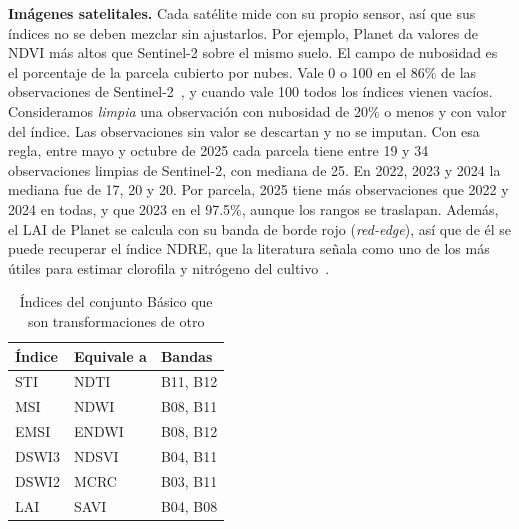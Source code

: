 \textbf{Imágenes satelitales.} Cada satélite mide con su propio sensor, así que sus índices no se deben mezclar sin
ajustarlos. Por ejemplo, Planet da valores de NDVI más altos que Sentinel-2 sobre el mismo suelo. El campo de
nubosidad es el porcentaje de la parcela cubierto por nubes. Vale 0 o 100 en el 86\% de las observaciones de Sentinel-2~\cite{drusch2012}, y cuando vale 100 todos los índices vienen vacíos. Consideramos \emph{limpia} una observación con nubosidad de 20\% o menos y con valor del índice. Las observaciones sin valor se descartan y no se imputan. Con esa regla, entre mayo y octubre de 2025 cada parcela tiene entre 19 y 34 observaciones limpias de Sentinel-2, con mediana de 25. En 2022, 2023 y 2024 la mediana fue de 17, 20 y 20. Por parcela, 2025 tiene más observaciones que 2022 y 2024 en todas, y que 2023 en el 97.5\%, aunque los rangos se traslapan. Además, el LAI de Planet se calcula con su banda de borde rojo
(\emph{red-edge}), así que de él se puede recuperar el índice NDRE, que la literatura señala como uno de los más
útiles para estimar clorofila y nitrógeno del cultivo~\cite{clevers2013}.


\begin{table}[!t]
\caption{Índices del conjunto Básico que son transformaciones de otro}\label{tab:duplicados}
\centering\footnotesize
\begin{tabular}{@{}lll@{}}
\toprule
Índice & Equivale a & Bandas \\
\midrule
STI & NDTI & B11, B12 \\
MSI & NDWI & B08, B11 \\
EMSI & ENDWI & B08, B12 \\
DSWI3 & NDSVI & B04, B11 \\
DSWI2 & MCRC & B03, B11 \\
LAI & SAVI & B04, B08 \\
\bottomrule
\end{tabular}
\end{table}

